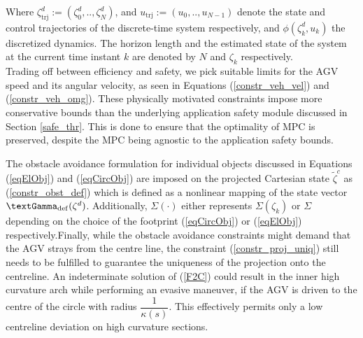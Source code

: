 \par Where ${\zeta^{d}_{\mathrm{trj}}}:= (\zeta^{d}_{0}, .., \zeta^{d}_{N})$, and ${u_{\mathrm{trj}}}:= (u_0, .., u_{N-1})$ denote the state and control trajectories of the discrete-time system respectively, and $\phi(\zeta^{d}_k, u_k)$ the discretized dynamics. The horizon length and the estimated state of the system at the current time instant $k$ are denoted by $N$ and $\zeta_k$ respectively.\\
Trading off between efficiency and safety, we pick suitable limits for the \ac{AGV} speed and its angular velocity, as seen in Equations (\ref{constr_veh_vel}) and (\ref{constr_veh_omg}). These physically motivated constraints impose more conservative bounds than the underlying application safety module discussed in Section \ref{safe_thr}. This is done to ensure that the optimality of \ac{MPC} is preserved, despite the MPC being agnostic to the application safety bounds.
\par The obstacle avoidance formulation for individual objects discussed in Equations (\ref{eqElObj}) and (\ref{eqCircObj}) are imposed on the projected Cartesian state $\tilde{\zeta}^{c}$ as (\ref{constr_obst_def}) which is defined as a nonlinear mapping of the state vector  $\textGamma_{\mathrm{def}}(\zeta^{d})$. Additionally, $\Sigma(\cdot)$ either represents $\Sigma(\zeta_{k})$ or $\Sigma$ depending on the choice of the footprint (\ref{eqCircObj}) or (\ref{eqElObj}) respectively.Finally, while the obstacle avoidance constraints might demand that the \ac{AGV} strays from the centre line, the constraint (\ref{constr_proj_uniq}) still needs to be fulfilled to guarantee the uniqueness of the projection onto the centreline. An indeterminate solution of (\ref{F2C}) could result in the inner high curvature arch while performing an evasive maneuver, if the \ac{AGV} is driven to the centre of the circle with radius $\dfrac{1}{\kappa(s)}$. This effectively permits only a low centreline deviation on high curvature sections.


